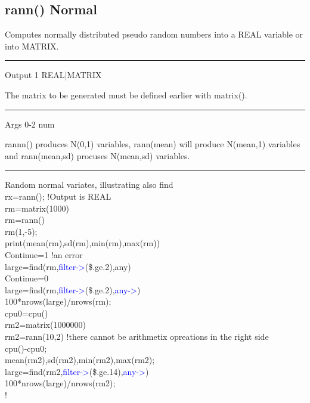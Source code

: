 \subsection{\textcolor{VioletRed}{rann}() Normal}
\label{rann}
Computes normally distributed pseudo random numbers into a REAL variable or
into MATRIX.
\vspace{0.3cm}
\hrule
\vspace{0.3cm}
\noindent Output \tabto{3cm} 1 \tabto{5cm}  REAL|MATRIX \tabto{7cm}
\begin{changemargin}{3cm}{0cm}
\noindent The matrix to be generated must be defined earlier with \textcolor{VioletRed}{matrix}().
\end{changemargin}
\vspace{0.3cm}
\hrule
\vspace{0.3cm}
\noindent Args \tabto{3cm} 0-2 \tabto{5cm}  num \tabto{7cm}
\begin{changemargin}{3cm}{0cm}
\noindent  rannn() produces N(0,1) variables, \textcolor{VioletRed}{rann}(mean) will produce
N(mean,1) variables and \textcolor{VioletRed}{rann}(mean,sd) procuses N(mean,sd) variables.
\end {changemargin}
\hrule
\vspace{0.2cm}
\begin{example}[rannex]Random normal variates, illustrating also find\\
\label{rannex}
rx=\textcolor{VioletRed}{rann}();  !Output is REAL\\
rm=\textcolor{VioletRed}{matrix}(1000)\\
rm=\textcolor{VioletRed}{rann}()\\
rm(1,-5);\\
\textcolor{VioletRed}{print}(\textcolor{VioletRed}{mean}(rm),\textcolor{VioletRed}{sd}(rm),\textcolor{VioletRed}{min}(rm),\textcolor{VioletRed}{max}(rm))\\
Continue=1 !an error\\
large=\textcolor{VioletRed}{find}(rm,\textcolor{blue}{filter->}(\$.ge.2),any)\\
Continue=0\\
large=\textcolor{VioletRed}{find}(rm,\textcolor{blue}{filter->}(\$.ge.2),\textcolor{blue}{any->})\\
100*nrows(large)/\textcolor{VioletRed}{nrows}(rm);\\
cpu0=\textcolor{VioletRed}{cpu}()\\
rm2=\textcolor{VioletRed}{matrix}(1000000)\\
rm2=\textcolor{VioletRed}{rann}(10,2)  !there cannot be arithmetix opreations in the right side\\
\textcolor{VioletRed}{cpu}()-cpu0;\\
\textcolor{VioletRed}{mean}(rm2),\textcolor{VioletRed}{sd}(rm2),\textcolor{VioletRed}{min}(rm2),\textcolor{VioletRed}{max}(rm2);\\
large=\textcolor{VioletRed}{find}(rm2,\textcolor{blue}{filter->}(\$.ge.14),\textcolor{blue}{any->})\\
100*nrows(large)/\textcolor{VioletRed}{nrows}(rm2);\\
	!
\end{example}
